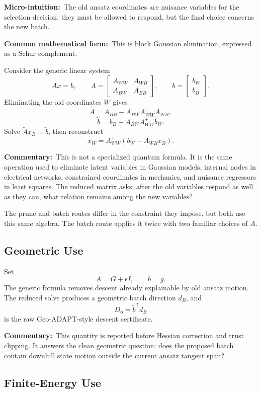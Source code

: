 \documentclass[10pt,twocolumn]{article}
\newcommand{\micro}[1]{\par\noindent\textbf{Micro-intuition:}\ #1\par}
\newcommand{\form}[1]{\par\noindent\textbf{Common mathematical form:}\ #1\par}
\newcommand{\commentary}[1]{\par\noindent\textbf{Commentary:}\ #1\par}
\begin{document}
\micro{The old ansatz coordinates are nuisance variables for the selection
decision: they must be allowed to respond, but the final choice concerns the
new batch.}

\form{This is block Gaussian elimination, expressed as a Schur complement.}

Consider the generic linear system
\[
Ax=b,
\qquad
A=
\begin{bmatrix}
A_{WW}&A_{WB}\\
A_{BW}&A_{BB}
\end{bmatrix},
\qquad
b=
\begin{bmatrix}
b_W\\b_B
\end{bmatrix}.
\]
Eliminating the old coordinates \(W\) gives
\[
\boxed{
\widetilde A
=A_{BB}-A_{BW}A_{WW}^{+}A_{WB},
}
\]
\[
\boxed{
\widetilde b
=b_B-A_{BW}A_{WW}^{+}b_W.
}
\]
Solve \(\widetilde A x_B=\widetilde b\), then reconstruct
\[
x_W=A_{WW}^{+}(b_W-A_{WB}x_B).
\]

\commentary{This is not a specialized quantum formula. It is the same
operation used to eliminate latent variables in Gaussian models, internal
nodes in electrical networks, constrained coordinates in mechanics, and
nuisance regressors in least squares. The reduced matrix asks: after the old
variables respond as well as they can, what relation remains among the new
variables?}

The prune and batch routes differ in the constraint they impose, but both use
this same algebra. The batch route applies it twice with two familiar choices
of \(A\).

\subsection*{Geometric Use}

Set
\[
A=G+\epsilon I,
\qquad b=g.
\]
The generic formula removes descent already explainable by old ansatz motion.
The reduced solve produces a geometric batch direction \(d_B\), and
\[
\boxed{D_0=\widetilde b^{\mathsf T}d_B}
\]
is the raw Geo-ADAPT-style descent certificate.

\commentary{This quantity is reported before Hessian correction and trust
clipping. It answers the clean geometric question: does the proposed batch
contain downhill state motion outside the current ansatz tangent span?}

\subsection*{Finite-Energy Use}
\end{document}
